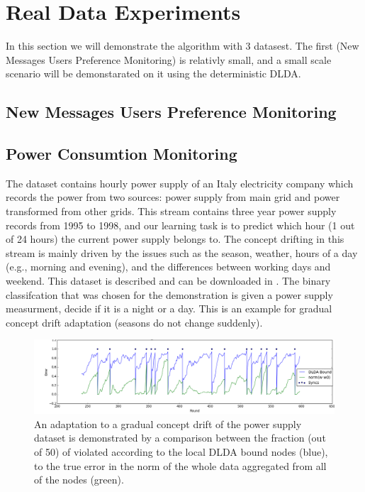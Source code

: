\documentclass[11pt,twocolumn,varwidth=true,a4paper,fleqn]{article}
\begin{document}
\section{Real Data Experiments}
In this section we will demonstrate the algorithm with 3 datasest. The first
(New Messages Users Preference Monitoring) is relativly small, and a small scale
scenario will be demonstarated on it using the deterministic DLDA. 
\subsection{New Messages Users Preference Monitoring}
\cite{usenet}
\subsection{Power Consumtion Monitoring}
The dataset contains hourly power supply of an Italy electricity company which
records the power from two sources: power supply from main grid and power 
transformed from other grids. This stream contains three year power supply records 
from 1995 to 1998, and our learning task is to predict which hour (1 out of 24 hours) the 
current power supply belongs to. The concept drifting in this stream is mainly 
driven by the issues such as the season, weather, hours of a day (e.g., morning 
and evening), and the differences between working days and weekend.  
This dataset is described and can be downloaded in \cite{powerSupply}.
The binary classifcation that was chosen for the demonstration is given a power
supply measurment, decide if it is a night or a day. This is an
example for gradual concept drift adaptation (seasons do not change suddenly).


\begin{figure}[h]
\centering
\includegraphics[width=\textwidth]{PowerSupply/errorComparison.png}
\caption{An adaptation to a gradual concept drift of the power
supply dataset is demonstrated by a comparison between the fraction (out of 50)
of violated according to the local DLDA bound nodes (blue), to the true error in the 
norm of the whole data aggregated from all of the nodes (green).}
\label{PowerSupply}
\end{figure}
\end{document}
